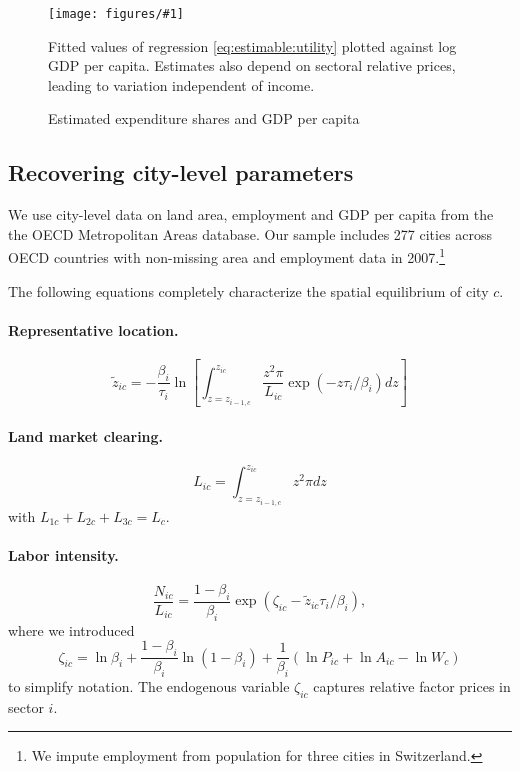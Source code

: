 \documentclass[12pt]{article}
\newcommand{\dofigure}[3]{\begin{figure}
\begin{centering}
\texttt{[image: figures/\#1]}
  \caption{#2\label{fig:#1}}
\end{centering}

\noindent \footnotesize{#3}
\end{figure}}
\begin{document}
\dofigure{city_level_inputs/expenditure_shares}{Estimated expenditure shares and GDP per capita}{Fitted values of regression \eqref{eq:estimable:utility} plotted against log GDP per capita. Estimates also depend on sectoral relative prices, leading to variation independent of income.}

\subsection{Recovering city-level parameters}
We use city-level data on land area, employment and GDP per capita from the the OECD Metropolitan Areas database. Our sample includes 277 cities across OECD countries with non-missing area and employment data in 2007.\footnote{We impute employment from population for three cities in Switzerland.}

The following equations completely characterize the spatial equilibrium of city $c$.

\paragraph{Representative location.}
\begin{equation}\label{eq:representative_location}
	\tilde z_{ic}
	=
	- \frac {\beta_i}{\tau_i}
	\ln
	\left[
	\int_{z=z_{i-1,c}}^{z_{ic}}
		\frac {z^2\pi}{L_{ic}}
		\exp(-z \tau_i/\beta_i)
		dz
	\right]
\end{equation}
\paragraph{Land market clearing.}
\begin{equation}\label{eq:land_market_clearing}
	L_{ic}
	=
	\int_{z=z_{i-1,c}}^{z_{ic}}
		z^2\pi
		dz
\end{equation}
with $L_{1c}+L_{2c}+L_{3c}=L_c$.

\paragraph{Labor intensity.}
\begin{equation}\label{eq:labor_intensity}
	\frac 	{N_{ic}}
			{L_{ic}}
	=
	\frac 	{1-\beta_i}
			{\beta_i}
	\exp(\zeta_{ic}-\tilde z_{ic} \tau_i/\beta_i),
\end{equation}
where we introduced
\[
\zeta_{ic}=\ln\beta_i + \frac{1-\beta_i}{\beta_i} \ln (1-\beta_i)
+ \frac 1{\beta_i} (\ln P_{ic} + \ln A_{ic} - \ln W_c)
\]
to simplify notation. The endogenous variable $\zeta_{ic}$ captures relative factor prices in sector $i$.
\end{document}
